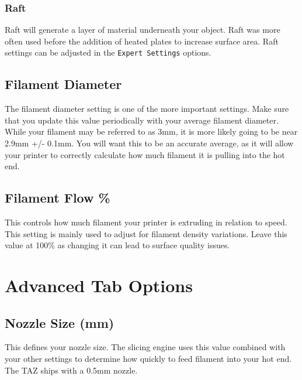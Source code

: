 \subsubsection{Raft}
Raft will generate a layer of material underneath your object. Raft was more often used before the addition of heated plates to increase surface area. Raft settings can be adjusted in the \texttt{Expert Settings} options.

\subsection{Filament Diameter}
The filament diameter setting is one of the more important settings. Make sure that you update this value periodically with your average filament diameter. While your filament may be referred to as 3mm, it is more likely going to be near 2.9mm +/- 0.1mm. You will want this to be an accurate average, as it will allow your printer to correctly calculate how much filament it is pulling into the hot end.

\subsection{Filament Flow \%}
This controls how much filament your printer is extruding in relation to speed. This setting is mainly used to adjust for filament density variations. Leave this value at 100\% as changing it can lead to surface quality issues.

\section{Advanced Tab Options}

\subsection{Nozzle Size (mm)}
This defines your nozzle size. The slicing engine uses this value combined with your other settings to determine how quickly to feed filament into your hot end. The TAZ ships with a 0.5mm nozzle. 


